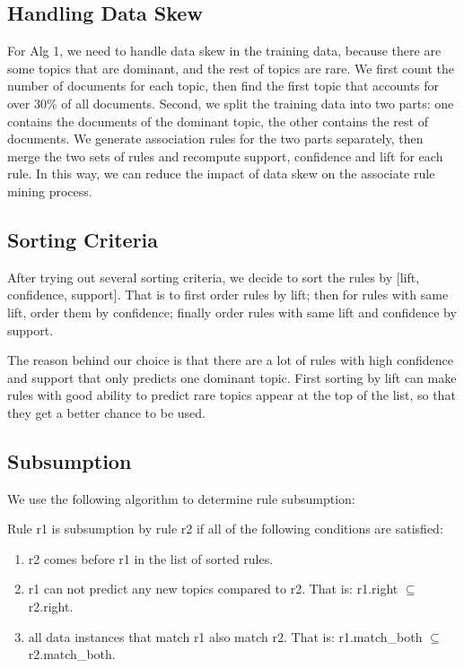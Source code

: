 \documentclass{article}
\begin{document}
\subsection{Handling Data Skew}
For Alg 1, we need to handle data skew in the training data, because there are
some topics that are dominant, and the rest of topics are rare. We first count
the number of documents for each topic, then find the first topic that accounts
for over 30\% of all documents. Second, we split the training data into two
parts: one contains the documents of the dominant topic, the other contains the
rest of documents. We generate association rules for the two parts separately,
then merge the two sets of rules and recompute support, confidence and lift for
each rule. In this way, we can reduce the impact of data skew on the associate
rule mining process.

\subsection{Sorting Criteria}
After trying out several sorting criteria, we decide to sort the rules
by [lift, confidence, support]. That is to first order rules by lift; then for
rules with same lift, order them by confidence; finally order rules with same
lift and confidence by support.

The reason behind our choice is that there are a lot of rules with
high confidence and support that only predicts one dominant topic. First sorting
by lift can make rules with good ability to predict rare topics
appear at the top of the list, so that they get a better chance to be used.

\subsection{Subsumption}
We use the following algorithm to determine rule subsumption:

Rule r1 is subsumption by rule r2 if all of the following conditions are
satisfied:
\begin{enumerate}
  \item r2 comes before r1 in the list of sorted rules.
  \item r1 can not predict any new topics compared to r2. That is: r1.right
  $\subseteq$ r2.right.
  \item all data instances that match r1 also match r2. That is:
  r1.match\_both $\subseteq$ r2.match\_both.
\end{enumerate}
\end{document}
